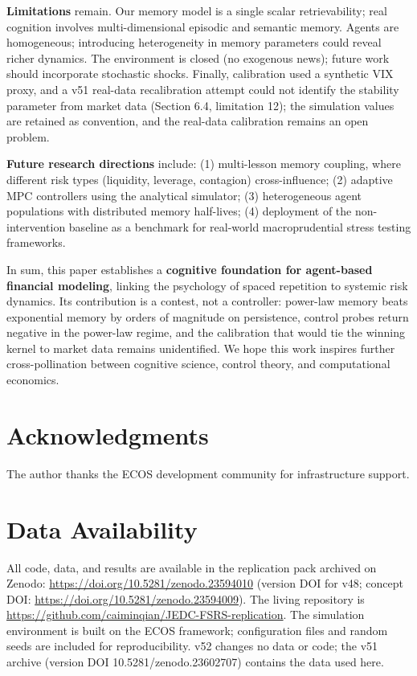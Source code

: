 \documentclass[11pt]{article}
\begin{document}
\textbf{Limitations} remain. Our memory model is a single scalar retrievability; real cognition involves multi-dimensional episodic and semantic memory. Agents are homogeneous; introducing heterogeneity in memory parameters could reveal richer dynamics. The environment is closed (no exogenous news); future work should incorporate stochastic shocks. Finally, calibration used a synthetic VIX proxy, and a v51 real-data recalibration attempt could not identify the stability parameter from market data (Section 6.4, limitation 12); the simulation values are retained as convention, and the real-data calibration remains an open problem.

\textbf{Future research directions} include: (1) multi-lesson memory coupling, where different risk types (liquidity, leverage, contagion) cross-influence; (2) adaptive MPC controllers using the analytical simulator; (3) heterogeneous agent populations with distributed memory half-lives; (4) deployment of the non-intervention baseline as a benchmark for real-world macroprudential stress testing frameworks.

In sum, this paper establishes a \textbf{cognitive foundation for agent-based financial modeling}, linking the psychology of spaced repetition to systemic risk dynamics. Its contribution is a contest, not a controller: power-law memory beats exponential memory by orders of magnitude on persistence, control probes return negative in the power-law regime, and the calibration that would tie the winning kernel to market data remains unidentified. We hope this work inspires further cross-pollination between cognitive science, control theory, and computational economics.

\section*{Acknowledgments}
The author thanks the ECOS development community for infrastructure support.

\appendix
\section{Data Availability}
All code, data, and results are available in the replication pack archived on Zenodo: \url{https://doi.org/10.5281/zenodo.23594010} (version DOI for v48; concept DOI: \url{https://doi.org/10.5281/zenodo.23594009}). The living repository is \url{https://github.com/caiminqian/JEDC-FSRS-replication}. The simulation environment is built on the ECOS framework; configuration files and random seeds are included for reproducibility. v52 changes no data or code; the v51 archive (version DOI 10.5281/zenodo.23602707) contains the data used here.
\end{document}
